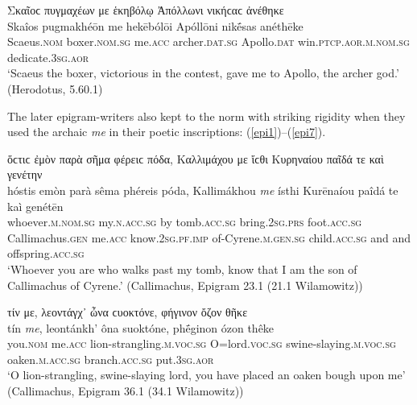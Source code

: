 \begin{exe}
\ex Σκαῖοϲ πυγμαχέων με ἑκηβόλῳ Ἀπόλλωνι νικήϲαϲ ἀνέθηκε\\
\gll Skaîos pugmakhéōn me hekēbólōi Apóllōni nikḗsas anéthēke\\
Scaeus.\textsc{nom} boxer.\textsc{nom.sg} me.\textsc{acc} archer.\textsc{dat.sg} Apollo.\textsc{dat} win.\textsc{ptcp.aor.m.nom.sg} dedicate.\textsc{3sg.aor}\\
\trans `Scaeus the boxer, victorious in the contest, gave me to Apollo, the archer god.' (Herodotus, 5.60.1)
\label{hdtMe2}
\end{exe}

The later epigram-writers also kept to the norm with striking rigidity when they used the archaic \textit{me} in their poetic inscriptions: (\ref{epi1})--(\ref{epi7}).

\begin{exe}
\ex ὅϲτιϲ ἐμὸν παρὰ σῆμα φέρειϲ πόδα, Καλλιμάχου {με} ἴϲθι Κυρηναίου παῖδά τε καὶ γενέτην\\
\gll hóstis emòn parà sêma phéreis póda, Kallimákhou \emph{me} ísthi Kurēnaíou paîdá te kaì genétēn\\
whoever.\textsc{m.nom.sg} my.\textsc{n.acc.sg} by tomb.\textsc{acc.sg} bring.\textsc{2sg.prs} foot.\textsc{acc.sg} Callimachus.\textsc{gen} me.\textsc{acc} know.\textsc{2sg.pf.imp} of-Cyrene.\textsc{m.gen.sg} child.\textsc{acc.sg} and and offspring.\textsc{acc.sg}\\
\trans `Whoever you are who walks past my tomb, know that I am the son of Callimachus of Cyrene.' (Callimachus, Epigram 23.1 (21.1 Wilamowitz))
\label{epi1}
\end{exe}

\begin{exe}
\ex τίν {με}, λεοντάγχ᾽ ὦνα ϲυοκτόνε, φήγινον ὄζον θῆκε\\
\gll tín \emph{me}, leontánkh' ôna suoktóne, phḗginon ózon thêke\\
you.\textsc{nom} me.\textsc{acc} lion-strangling.\textsc{m.voc.sg} O=lord.\textsc{voc.sg} swine-slaying.\textsc{m.voc.sg} oaken.\textsc{m.acc.sg} branch.\textsc{acc.sg} put.\textsc{3sg.aor}\\
\trans `O lion-strangling, swine-slaying lord, you have placed an oaken bough upon me' (Callimachus, Epigram 36.1 (34.1 Wilamowitz))
\label{epi2}
\end{exe}


